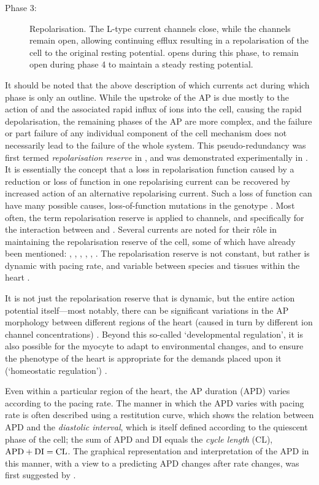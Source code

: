 \documentclass[../thesis-main.tex]{subfiles}
\begin{document}
\begin{description}
  \item[Phase 3:] Repolarisation. The L-type \ca{} current channels close, while the \iks{} channels remain open, allowing continuing \K{} efflux resulting in a repolarisation of the cell to the original resting potential. \ikix{} opens during this phase, to remain open during phase 4 to maintain a steady resting potential. 
 \end{description}
 It should be noted that the above description of which currents act during which phase is only an outline. While the upstroke of the AP is due mostly to the action of \ina{} and the associated rapid influx of \na{} ions into the cell, causing the rapid depolarisation, the remaining phases of the AP are more complex, and the failure or part failure of any individual component of the cell mechanism does not necessarily lead to the failure of the whole system. This pseudo-redundancy was first termed \emph{repolarisation reserve} in \citet{Roden1998}, and was demonstrated experimentally in \citet{Varro2000}. It is essentially the concept that a loss in repolarisation function caused by a reduction or loss of function in one repolarising current can be recovered by increased action of an alternative repolarising current. Such a loss of function can have many possible causes, \eg{} loss-of-function mutations in the genotype \citep{Rosati2004}. Most often, the term repolarisation reserve is applied to \K{} channels, and specifically for the interaction between \ikr{} and \iks{} \citep{Xiao2008}. Several currents are noted for their r\^ole in maintaining the repolarisation reserve of the cell, some of which have already been mentioned: \ikr{}, \iks{}, \ikix{}, \ito{}, \ica{}, \ina{} \citep{Varro2011}. The repolarisation reserve is not constant, but rather is dynamic with pacing rate, and variable between species and tissues within the heart \citep{Carmeliet2006}.
 
 It is not just the repolarisation reserve that is dynamic, but the entire action potential itself---most notably, there can be significant variations in the AP morphology between different regions of the heart (caused in turn by different ion channel concentrations) \citep{Giles1988}. Beyond this so-called `developmental regulation', it is also possible for the myocyte to adapt to environmental changes, and to ensure the phenotype of the heart is appropriate for the demands placed upon it (`homeostatic regulation') \citep{Rosati2004}.
 
 Even within a particular region of the heart, the AP duration (APD) varies according to the pacing rate. The manner in which the APD varies with pacing rate is often described using a restitution curve, which shows the relation between APD and the \emph{diastolic interval}, which is itself defined according to the quiescent phase of the cell; the sum of APD and DI equals the \emph{cycle length} (CL), \idest{} $\textnormal{APD}+\textnormal{DI}=\textnormal{CL}$. The graphical representation and interpretation of the APD in this manner, with a view to a predicting APD changes after rate changes, was first suggested by \citet{Nolasco1968}.
 
\end{document}

